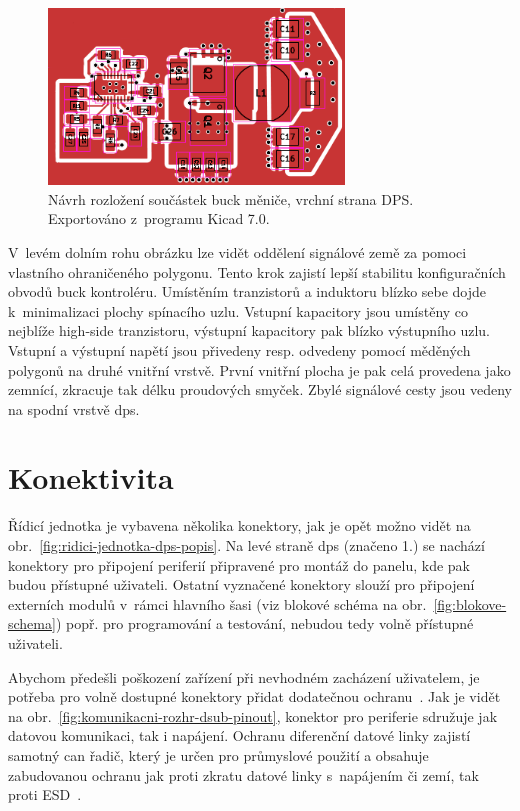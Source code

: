             \begin{figure}[h!]
                \centering
                \includegraphics[width=0.7\textwidth]{obrazky/exportovane/lm5148buck-edit.png}
                \caption{Návrh rozložení součástek buck měniče, vrchní strana DPS. Exportováno z~programu Kicad 7.0.}
                \label{fig:lm5148buck-edit-png}
            \end{figure}
            
            V~levém dolním rohu obrázku lze vidět oddělení signálové země za pomoci vlastního ohraničeného polygonu. Tento krok zajistí lepší stabilitu konfiguračních obvodů buck kontroléru. Umístěním tranzistorů a induktoru blízko sebe dojde k~minimalizaci plochy spínacího uzlu.
            Vstupní kapacitory jsou umístěny co nejblíže high-side tranzistoru, výstupní kapacitory pak blízko výstupního uzlu. Vstupní a výstupní napětí jsou přivedeny resp. odvedeny pomocí měděných polygonů na druhé vnitřní vrstvě. První vnitřní plocha je pak celá provedena jako zemnící, zkracuje tak délku proudových smyček. Zbylé signálové cesty jsou vedeny na spodní vrstvě \acs{dps}.

    \section{Konektivita}
        Řídicí jednotka je vybavena několika konektory, jak je opět možno vidět na obr.~\ref{fig:ridici-jednotka-dps-popis}. Na levé straně \acs{dps} (značeno 1.) se nachází konektory pro připojení periferií připravené pro montáž do panelu, kde pak budou přístupné uživateli. Ostatní vyznačené konektory slouží pro připojení externích modulů v~rámci hlavního šasi (viz blokové schéma na obr.~\ref{fig:blokove-schema}) popř. pro programování a testování, nebudou tedy volně přístupné uživateli.

        Abychom předešli poškození zařízení při nevhodném zacházení uživatelem, je potřeba pro volně dostupné konektory přidat dodatečnou ochranu~\cite{altium-circuit-protection}. Jak je vidět na obr.~\ref{fig:komunikacni-rozhr-dsub-pinout}, konektor pro periferie sdružuje jak datovou komunikaci, tak i napájení. Ochranu diferenční datové linky zajistí samotný \acs{can} řadič, který je určen pro průmyslové použití a obsahuje zabudovanou ochranu jak proti zkratu datové linky s~napájením či zemí, tak proti ESD~\cite{ata-datasheet}. 

